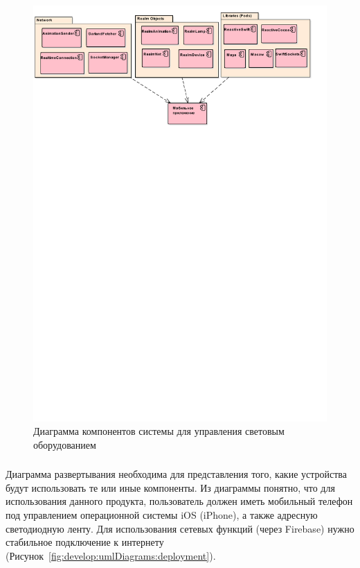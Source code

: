 ~
\begin{figure}[H]
\centering
	\includegraphics[scale=0.8]{figures/diagrams/uml_component.pdf}
	\caption{Диаграмма компонентов системы для управления световым оборудованием}
	\label{fig:develop:umlDiagrams:component}
\end{figure}

\vspace*{-\baselineskip}
\subsubsection{}	Диаграмма развертывания необходима для представления того, какие устройства будут использовать те или иные компоненты. Из диаграммы понятно, что для использования данного продукта, пользователь должен иметь мобильный телефон под управлением операционной системы iOS (iPhone), а также адресную светодиодную ленту. Для использования сетевых функций (через Firebase) нужно стабильное подключение к интернету (Рисунок~\ref{fig:develop:umlDiagrams:deployment}).


